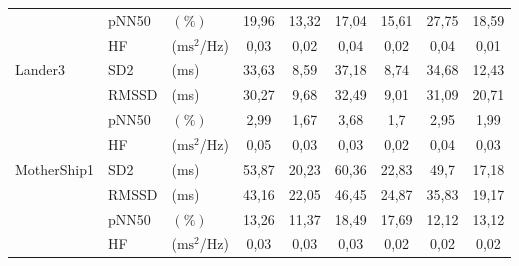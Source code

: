 \begin{table}[!htb]
\begin{threeparttable}
\begin{tabular*}{\linewidth}{@{\extracolsep{\fill}} lllcccccc @{}}
            & pNN50                                 & $(\%)$                              & 19,96                               & 13,32                               & 17,04           & 15,61       & 27,75           & 18,59       \\
            & HF                                    & ($\text{ms}^2$/Hz)                  & 0,03                                & 0,02                                & 0,04            & 0,02        & 0,04            & 0,01        \\ \midrule
            \multirow[t]{4}{*}{Lander3}     & SD2                                  & (ms)                                & 33,63                               & 8,59                                & 37,18           & 8,74        & 34,68           & 12,43       \\
            & RMSSD                                 & (ms)                                & 30,27                               & 9,68                                & 32,49           & 9,01        & 31,09           & 20,71       \\
            & pNN50                                 & $(\%)$                              & 2,99                                & 1,67                                & 3,68            & 1,7         & 2,95            & 1,99        \\
            & HF                                    & ($\text{ms}^2$/Hz)                  & 0,05                                & 0,03                                & 0,03            & 0,02        & 0,04            & 0,03        \\ \midrule
            \multirow[t]{4}{*}{MotherShip1} & SD2                                  & (ms)                                & 53,87                               & 20,23                               & 60,36           & 22,83       & 49,7            & 17,18       \\
            & RMSSD                                 & (ms)                                & 43,16                               & 22,05                               & 46,45           & 24,87       & 35,83           & 19,17       \\
            & pNN50                                 & $(\%)$                              & 13,26                               & 11,37                               & 18,49           & 17,69       & 12,12           & 13,12       \\
            & HF                                    & ($\text{ms}^2$/Hz)                  & 0,03                                & 0,03                                & 0,03            & 0,02        & 0,02            & 0,02        \\ \midrule

\end{tabular*}
\end{threeparttable}
\end{table}
